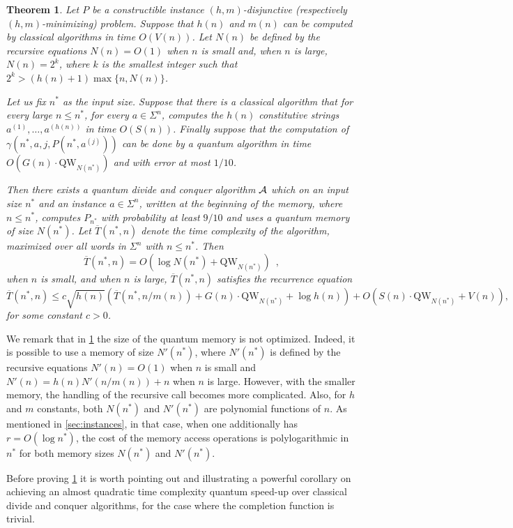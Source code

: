 \documentclass[12pt]{article}
\newcommand{\qw}{\mathrm{QW}}
\newtheorem{theorem}{Theorem}
\theoremstyle{definition}
\begin{document}
\begin{theorem}
\label{thm:recgen}
Let $P$ be a constructible instance $(h,m)$-{disjunctive} (respectively $(h,m)$-{minimizing}) problem. 
Suppose that $h(n)$ and $m(n)$ can be computed by classical algorithms in time $O(V(n))$. 
Let $N(n)$ be defined by the recursive equations $N(n) = O(1)$ when $n$ is small and, when $n$ is large, $N(n) = 2^k$, where $k$ is the smallest integer such that $2^k > \left( h(n)+1\right)\max\{n, N(n)\}$.

Let us fix $n^*$ as the input size. Suppose that there is a classical algorithm that for every large $n \leq n^*$, for every $a \in \Sigma^{n}$, computes the $h(n)$ constitutive strings $a^{(1)}, \ldots , a^{(h(n))}$ in time $O(S(n))$. 
Finally suppose that the computation of $\gamma(n^*, a, j, P(n^*, a^{(j)}))$ can be done by a quantum algorithm in time $O(G(n) \cdot \qw_{N(n^*)})$ and with error at most $1/10$.

Then there exists a quantum divide and conquer algorithm ${\cal A}$ which on an input size $n^*$ and an instance $a \in \Sigma^{n}$, written at the beginning of the memory, where $n \leq n^*$, computes $P_{n^*}$ with probability at least $9/10$
and uses a quantum memory of size $N(n^*)$.
Let $\overline{T}(n^*, n)$ denote the time complexity of the algorithm, maximized over all words in $\Sigma^n$ with $n \leq n^*$.
Then 
\[
\overline{T}(n^*, n) = O(\log  N(n^*) + \qw_{N(n^*)})  \enspace,
\]
when $n$ is small, and when $n$ is large, $\overline{T}(n^*, n)$ satisfies the recurrence equation
\[
\overline{T}(n^*,n) \leq c \sqrt{h(n)} \left(\overline{T}(n^*, n/m(n)) + G(n) \cdot \qw_{N(n^*)} + \log h(n) \right) + 
{O} \left( S(n) \cdot \qw_{N(n^*)} + V(n) \right),
\]
for some constant $c > 0$.
\end{theorem}

We remark that in \cref{thm:recgen} the size of the quantum memory is not optimized. Indeed, it is possible to use a memory of size $N'(n^*)$, where $N'(n^*)$ is defined by the recursive equations $N'(n) = O(1)$ when $n$ is small and $N'(n) = h(n) N'(n/m(n)) + n$ when $n$ is large. However, with the smaller memory, the handling of the recursive call becomes more
complicated. 
Also, for $h$ and $m$ constants, both $N(n^*)$ and $N'(n^*)$ are polynomial functions of $n$.
As mentioned in \cref{sec:instances}, in that case, when one additionally has $r = O(\log n^*)$, the cost of the memory access operations is polylogarithmic in $n^*$ for both memory sizes $N(n^*)$ and $N'(n^*)$. 


Before proving \cref{thm:recgen} it is worth pointing out and illustrating a powerful corollary on achieving an almost quadratic time complexity quantum speed-up over classical divide and conquer algorithms, for the case where the completion function is trivial.
\end{document}
